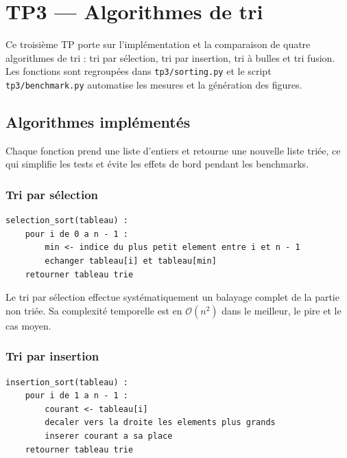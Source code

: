 \section{TP3 --- Algorithmes de tri}\label{sec:tp3}

Ce troisi\`{e}me TP porte sur l'impl\'{e}mentation et la comparaison de quatre
algorithmes de tri : tri par s\'{e}lection, tri par insertion, tri \`{a} bulles et
tri fusion.
Les fonctions sont regroup\'{e}es dans \texttt{tp3/sorting.py} et le
script \texttt{tp3/benchmark.py} automatise les mesures et la g\'{e}n\'{e}ration des
figures.

\subsection{Algorithmes impl\'{e}ment\'{e}s}\label{subsec:tp3-algorithmes}

Chaque fonction prend une liste d'entiers et retourne une nouvelle liste tri\'{e}e,
ce qui simplifie les tests et \'{e}vite les effets de bord pendant les benchmarks.

\subsubsection{Tri par s\'{e}lection}\label{subsubsec:tp3-selection}

\begin{lstlisting}[basicstyle=\ttfamily,label={lst:tp3-selection}]
selection_sort(tableau) :
    pour i de 0 a n - 1 :
        min <- indice du plus petit element entre i et n - 1
        echanger tableau[i] et tableau[min]
    retourner tableau trie
\end{lstlisting}

Le tri par s\'{e}lection effectue syst\'{e}matiquement un balayage complet de la
partie non tri\'{e}e.
Sa complexit\'{e} temporelle est en \(\mathcal{O}(n^2)\) dans
le meilleur, le pire et le cas moyen.

\subsubsection{Tri par insertion}\label{subsubsec:tp3-insertion}

\begin{lstlisting}[basicstyle=\ttfamily,label={lst:tp3-insertion}]
insertion_sort(tableau) :
    pour i de 1 a n - 1 :
        courant <- tableau[i]
        decaler vers la droite les elements plus grands
        inserer courant a sa place
    retourner tableau trie
\end{lstlisting}

